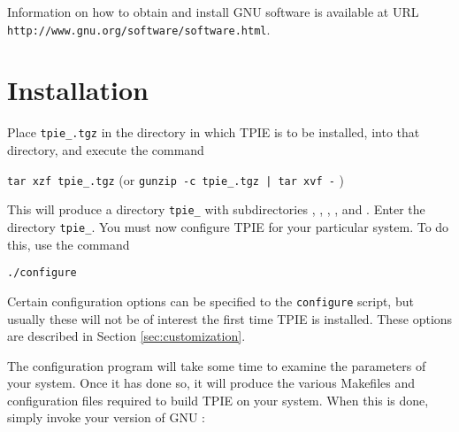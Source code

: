 Information on how to obtain and install GNU software is
available at URL \\%
{\tt http://www.gnu.org/software/software.html}.


\section{Installation}


Place {\tt tpie\_\version.tgz} in the directory in which TPIE is to
be installed,  into that directory, and execute the command

\begin{flushleft}
{\tt tar xzf tpie\_\version.tgz}
(or {\tt gunzip -c tpie\_\version.tgz | tar xvf -} )  
\end{flushleft}

This will produce a directory {\tt tpie\_\version} with
subdirectories , , ,
, and .  Enter the directory 
{\tt tpie\_\version}.  You must now configure TPIE for your
particular system.  To do this, use the command

\begin{verbatim}
./configure
\end{verbatim}

 Certain configuration options can be
specified to the {\tt configure} script, but usually these
will not be of interest the first time TPIE is installed.
These options are described in Section \ref{sec:customization}.

The configuration program will take some time to
examine the parameters of your system.  Once it has done so, it will
produce the various Makefiles and configuration files required to
build TPIE on your system.  When this is done, simply invoke your version
of GNU :


